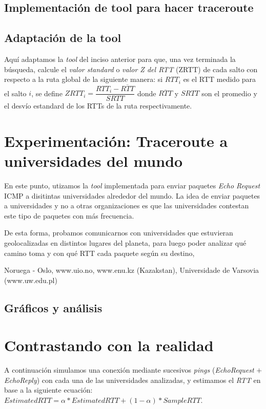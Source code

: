 \documentclass[final,inline,a4paper,narroweqnarray]{ieee}
\let\Oldsection\section
\renewcommand{\section}{\FloatBarrier\Oldsection}
\let\Oldsubsection\subsection
\renewcommand{\subsection}{\FloatBarrier\Oldsubsection}
\begin{document}
\subsection{ Implementación de tool para hacer traceroute }

\subsection{ Adaptación de la tool }
Aquí adaptamos la \emph{tool} del inciso anterior para que, una vez terminada la búsqueda, calcule el \emph{valor standard}  o \emph{valor Z del RTT} (ZRTT) de cada salto con respecto a la ruta global de la siguiente manera: si $RTT_i$ es el RTT medido para el salto $i$, se define $ ZRTT_i = \dfrac{RTT_i - \overline{RTT}}{SRTT} $ donde $\overline{RTT}$ y $SRTT$ son el promedio y el desvío estandard de los RTTs de la ruta respectivamente.  

\section{ Experimentación: Traceroute a universidades del mundo }
En este punto, utizamos la \emph{tool} implementada para enviar paquetes \emph{Echo Request} ICMP a disitintas universidades alrededor del mundo. La idea de enviar paquetes a universidades y no a otras organizaciones es que las universidades contestan este tipo de paquetes con más frecuencia.

De esta forma, probamos comunicarnos con universidades que estuvieran geolocalizadas en distintos lugares del planeta, para luego poder analizar qué camino toma y con qué RTT cada paquete según su destino, 

Noruega - Oslo, www.uio.no, www.enu.kz (Kazakstan), Universidade de Varsovia (www.uw.edu.pl)

\subsection{Gráficos y análisis}

\section{ Contrastando con la realidad }
A continuación simulamos una conexión mediante sucesivos \emph{pings} (\emph{EchoRequest} $+$ \emph{EchoReply}) con cada una de las universidades analizadas, y estimamos el \emph{RTT} en base a la siguiente ecuación: $ EstimatedRTT = \alpha * EstimatedRTT + (1 - \alpha) * SampleRTT $. 
\end{document}
